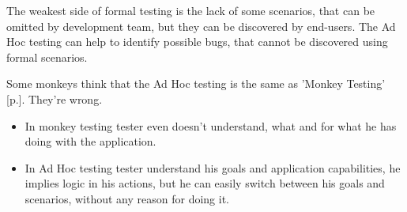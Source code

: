 The weakest side of formal testing is the lack of some scenarios, that can be omitted by development team, but they can be discovered by end-users. The Ad Hoc testing can help to identify possible bugs, that cannot be discovered using formal scenarios.

Some monkeys think that the Ad Hoc testing is the same as 'Monkey Testing' [p.\pageref{sec:Monkey Testing}]. They're wrong.

\begin{itemize}
\item {In monkey testing tester even doesn't understand, what and for what he has doing with the application.}

\item {In Ad Hoc testing tester understand his goals and application capabilities, he implies logic in his actions, but he can easily switch between his goals and scenarios, without any reason for doing it.}
\end{itemize}
